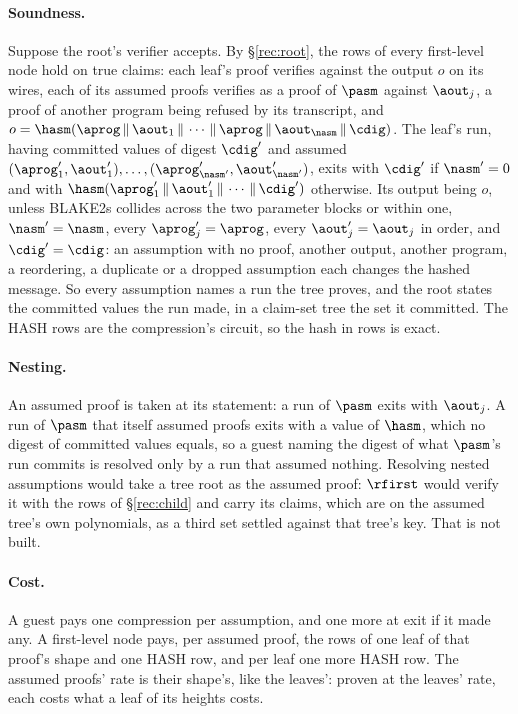 \paragraph{Soundness.} Suppose the root's verifier accepts. By \S\ref{rec:root}, the rows of every first-level node hold on true claims: each leaf's proof verifies against the output $o$ on its wires, each of its assumed proofs verifies as a proof of $\pasm$ against $\aout_j$, a proof of another program being refused by its transcript, and $o=\hasm(\aprog\,\|\,\aout_1\,\|\,\cdots\,\|\,\aprog\,\|\,\aout_{\nasm}\,\|\,\cdig)$. The leaf's run, having committed values of digest $\cdig'$ and assumed $(\aprog'_1,\aout'_1),\dots,(\aprog'_{\nasm'},\aout'_{\nasm'})$, exits with $\cdig'$ if $\nasm'=0$ and with $\hasm(\aprog'_1\,\|\,\aout'_1\,\|\,\cdots\,\|\,\cdig')$ otherwise. Its output being $o$, unless BLAKE2s collides across the two parameter blocks or within one, $\nasm'=\nasm$, every $\aprog'_j=\aprog$, every $\aout'_j=\aout_j$ in order, and $\cdig'=\cdig$: an assumption with no proof, another output, another program, a reordering, a duplicate or a dropped assumption each changes the hashed message. So every assumption names a run the tree proves, and the root states the committed values the run made, in a claim-set tree the set it committed. The \textsf{HASH} rows are the compression's circuit, so the hash in rows is exact.

\paragraph{Nesting.} An assumed proof is taken at its statement: a run of $\pasm$ exits with $\aout_j$. A run of $\pasm$ that itself assumed proofs exits with a value of $\hasm$, which no digest of committed values equals, so a guest naming the digest of what $\pasm$'s run commits is resolved only by a run that assumed nothing. Resolving nested assumptions would take a tree root as the assumed proof: $\rfirst$ would verify it with the rows of \S\ref{rec:child} and carry its claims, which are on the assumed tree's own polynomials, as a third set settled against that tree's key. That is not built.

\paragraph{Cost.} A guest pays one compression per assumption, and one more at exit if it made any. A first-level node pays, per assumed proof, the rows of one leaf of that proof's shape and one \textsf{HASH} row, and per leaf one more \textsf{HASH} row. The assumed proofs' rate is their shape's, like the leaves': proven at the leaves' rate, each costs what a leaf of its heights costs.
